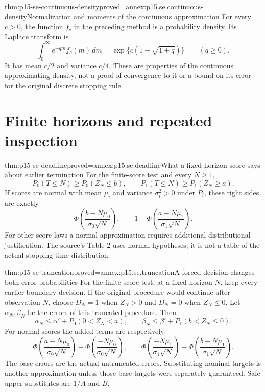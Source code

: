 \begin{hblemma}{thm:p15-se-continuous-density}{proved=annex:p15.se.continuous-density}{Normalization and moments of the continuous approximation}
For every \(c>0\), the function \(f_c\) in the preceding method is
a probability density. Its Laplace transform is
\[
       \int_0^\infty e^{-qm}f_c(m)\,dm
                   =\exp\{c(1-\sqrt{1+q})\}\qquad(q\geq0).
\]
It has mean \(c/2\) and variance \(c/4\). These are properties of
the continuous approximating density, not a proof of convergence to it
or a bound on its error for the original discrete stopping rule.
\end{hblemma}

\section{Finite horizons and repeated inspection}
\label{sec:p15-se-finite-horizons}

\begin{hbtheorem}{thm:p15-se-deadline}{proved=annex:p15.se.deadline}{What a fixed-horizon score says about earlier termination}
For the finite-score test and every \(N\geq1\),
\[
 P_0(T\leq N)\geq P_0(Z_N\leq b),\qquad
 P_1(T\leq N)\geq P_1(Z_N\geq a).
\]
If scores are normal with mean \(\mu_i\) and variance
\(\sigma_i^2>0\) under \(P_i\), these right sides are exactly
\[
 \Phi\left(\frac{b-N\mu_0}{\sigma_0\sqrt N}\right),\qquad
 1-\Phi\left(\frac{a-N\mu_1}{\sigma_1\sqrt N}\right).
\]
For other score laws a normal approximation requires additional
distributional justification. The source's Table 2 uses normal
hypotheses; it is not a table of the actual stopping-time distribution.
\cite[Section 4.5]{Wald1945SequentialTests}
\end{hbtheorem}

\begin{hbtheorem}{thm:p15-se-truncation}{proved=annex:p15.se.truncation}{A forced decision changes both error probabilities}
For the finite-score test, at a fixed horizon \(N\), keep every
earlier boundary decision. If
the original procedure would continue after observation \(N\), choose
\(D_N=1\) when \(Z_N>0\) and \(D_N=0\) when \(Z_N\leq0\).
Let \(\alpha_N,\beta_N\) be the errors of this truncated procedure.
Then
\[
 \alpha_N\leq\alpha'+P_0(0<Z_N<a),\qquad
 \beta_N\leq\beta'+P_1(b<Z_N\leq0).
\]
For normal scores the added terms are respectively
\[
 \Phi\left(\frac{a-N\mu_0}{\sigma_0\sqrt N}\right)
 -\Phi\left(\frac{-N\mu_0}{\sigma_0\sqrt N}\right),\qquad
 \Phi\left(\frac{-N\mu_1}{\sigma_1\sqrt N}\right)
 -\Phi\left(\frac{b-N\mu_1}{\sigma_1\sqrt N}\right).
\]
The base errors are the actual untruncated errors. Substituting nominal
targets is another approximation unless those base targets were separately
guaranteed. Safe upper substitutes are \(1/A\) and \(B\).
\cite[Section 4.6, equations (4.63)--(4.70)]{Wald1945SequentialTests}
\end{hbtheorem}

